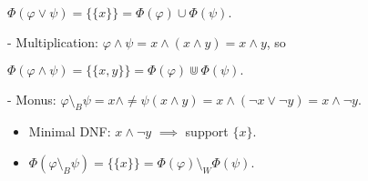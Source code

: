   \(\Phi(\varphi\vee\psi) = \{\{x\}\} = \Phi(\varphi)\cup\Phi(\psi).\)

- Multiplication:  
  \(\varphi \wedge \psi = x\wedge(x\wedge y) = x\wedge y\), so

  \(\Phi(\varphi\wedge\psi) = \{\{x,y\}\} = \Phi(\varphi)\Cup\Phi(\psi).\)

- Monus:  
  \(\varphi\setminus_B\psi = x\wedge\ne\psi(x\wedge y) = x\wedge(\neg x\vee\neg y) = x\wedge\neg y\).
\begin{itemize}
    \item Minimal DNF: \(x\wedge\neg y\) $\implies$ support \(\{x\}\).
    \item \(\Phi(\varphi\setminus_B\psi) = \{\{x\}\} = \Phi(\varphi)\setminus_W\Phi(\psi).\)
\end{itemize}